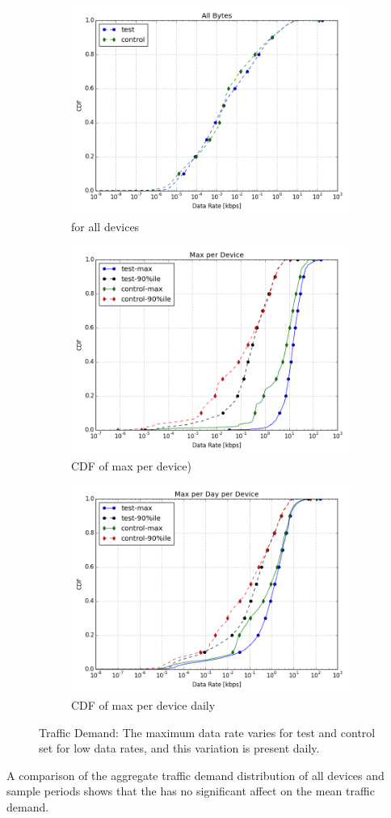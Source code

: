 \begin{figure}[ht]

\centering
\begin{subfigure}[b]{0.33\textwidth}
\includegraphics[width=0.30\linewidth]{figures/cdf-all-bytes.png}
  \caption{for all devices}
  \label{fig:CDF-data-rate-all}
\end{subfigure}

\begin{subfigure}[b]{0.33\textwidth}
\includegraphics[width=0.30\linewidth]{figures/cdf-max-per-device.png}
  \caption{CDF of max per device)}
\label{fig:CDF-data-rate-max}
\end{subfigure}

\begin{subfigure}[b]{0.33\textwidth}
\includegraphics[width=0.30\linewidth]{figures/cdf-max-per-day-per-device.png}
  \caption{CDF of max per device daily}
  \label{fig:CDF-data-rate-max-daily}
\end{subfigure}

\caption{Traffic Demand: The maximum data rate varies for test and control 
set for low data rates, and this variation is present daily.}
\label{fig:traffic-demand}

\end{figure}


A comparison of the aggregate traffic demand distribution of all devices 
and sample periods shows that the \treatment{} has no significant affect on the 
mean traffic demand. 
